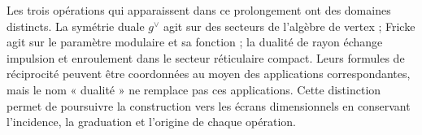 

Les trois opérations qui apparaissent dans ce prolongement ont des domaines distincts. La symétrie duale \(g^\vee\) agit sur des secteurs de l'algèbre de vertex ; Fricke agit sur le paramètre modulaire et sa fonction ; la dualité de rayon échange impulsion et enroulement dans le secteur réticulaire compact. Leurs formules de réciprocité peuvent être coordonnées au moyen des applications correspondantes, mais le nom « dualité » ne remplace pas ces applications. Cette distinction permet de poursuivre la construction vers les écrans dimensionnels en conservant l'incidence, la graduation et l'origine de chaque opération.

